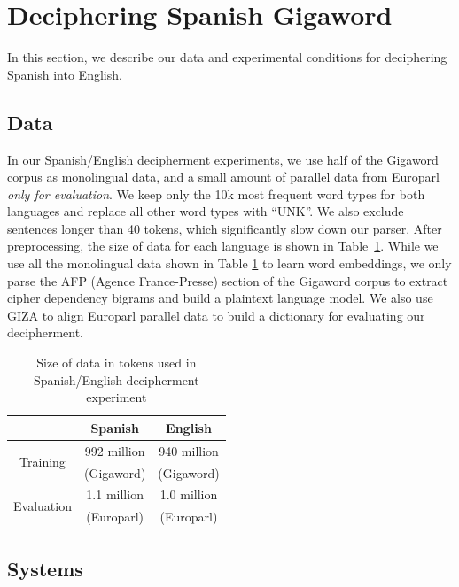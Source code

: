\section{Deciphering Spanish Gigaword}
\label{decipher_spanish}

In this section, we describe our data and experimental conditions for deciphering Spanish into English.

\subsection{Data}

In our Spanish/English decipherment experiments, we use half of the Gigaword corpus as monolingual data, and a small amount of parallel data from Europarl {\em only for evaluation}. We keep only the 10k most frequent word types for both languages and replace all other word types with ``UNK''.  We also exclude sentences longer than 40 tokens, which significantly slow down our parser. After preprocessing, the size of data for each language is shown in Table~\ref{es-en-data}. 
While we use all the monolingual data shown in Table \ref{es-en-data} to learn word embeddings, we only parse the AFP (Agence France-Presse) section of the Gigaword corpus to extract cipher dependency bigrams and build a plaintext language model. We also use GIZA \cite{GIZA} to align Europarl parallel data to build a dictionary for evaluating our decipherment.

 \begin{table}
 \begin{center}
 \begin{tabular}{ |c|c|c| } \hline
             & Spanish & English \\ \hline
\multirow{2}{*}{Training} & 992 million & 940 million \\ 
 & (Gigaword) & (Gigaword)  \\ \hline
\multirow{2}{*}{Evaluation} & 1.1 million & 1.0 million \\
 & (Europarl) & (Europarl) \\ \hline
 \end{tabular}
 \caption{Size of data in tokens used in Spanish/English decipherment experiment}
 \label{es-en-data}
 \end{center}
 \end{table}

\subsection{Systems}

